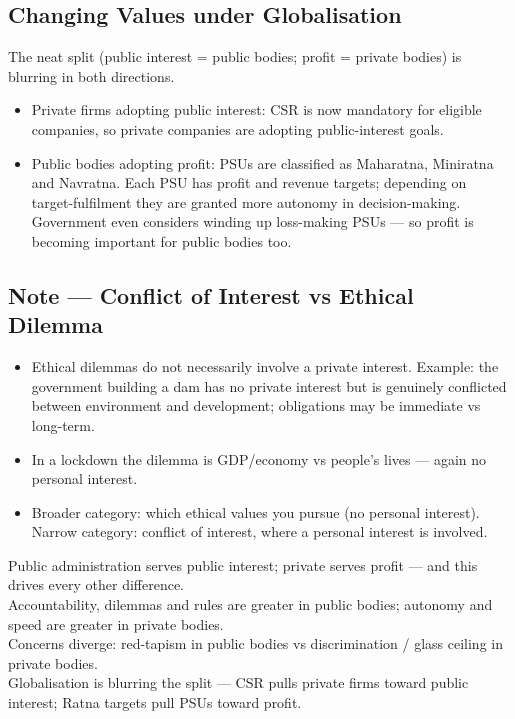 \subsection{Changing Values under Globalisation}
The neat split (public interest = public bodies; profit = private bodies) is blurring in both directions.

\begin{GovtPolicy}
\begin{itemize}
\item Private firms adopting public interest: CSR is now mandatory for eligible companies, so private companies are adopting public-interest goals.
\item Public bodies adopting profit: PSUs are classified as Maharatna, Miniratna and Navratna. Each PSU has profit and revenue targets; depending on target-fulfilment they are granted more autonomy in decision-making. Government even considers winding up loss-making PSUs --- so profit is becoming important for public bodies too.
\end{itemize}
\end{GovtPolicy}

\subsection{Note --- Conflict of Interest vs Ethical Dilemma}
\begin{CriticalPoint}
\begin{itemize}
\item Ethical dilemmas do not necessarily involve a private interest. Example: the government building a dam has no private interest but is genuinely conflicted between environment and development; obligations may be immediate vs long-term.
\item In a lockdown the dilemma is GDP/economy vs people's lives --- again no personal interest.
\item Broader category: which ethical values you pursue (no personal interest). Narrow category: conflict of interest, where a personal interest is involved.
\end{itemize}
\end{CriticalPoint}

\begin{QuickRevision}
Public administration serves public interest; private serves profit --- and this drives every other difference.\\
Accountability, dilemmas and rules are greater in public bodies; autonomy and speed are greater in private bodies.\\
Concerns diverge: red-tapism in public bodies vs discrimination / glass ceiling in private bodies.\\
Globalisation is blurring the split --- CSR pulls private firms toward public interest; Ratna targets pull PSUs toward profit.
\end{QuickRevision}

